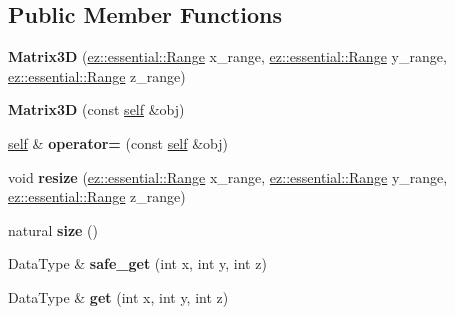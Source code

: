 \subsection*{Public Member Functions}
\begin{DoxyCompactItemize}
\item 
\mbox{\label{classez_1_1objects_1_1Matrix3D_a4c811f58573ac9d4e6734a661040610d}} 
{\bfseries Matrix3D} (\hyperlink{classez_1_1essential_1_1Range}{ez\+::essential\+::\+Range} x\+\_\+range, \hyperlink{classez_1_1essential_1_1Range}{ez\+::essential\+::\+Range} y\+\_\+range, \hyperlink{classez_1_1essential_1_1Range}{ez\+::essential\+::\+Range} z\+\_\+range)
\item 
\mbox{\label{classez_1_1objects_1_1Matrix3D_a9c59c894cd089e7df30e898825608159}} 
{\bfseries Matrix3D} (const \hyperlink{classez_1_1objects_1_1Matrix2D}{self} \&obj)
\item 
\mbox{\label{classez_1_1objects_1_1Matrix3D_a57c03371c577f882b6c3d44c10d681da}} 
\hyperlink{classez_1_1objects_1_1Matrix2D}{self} \& {\bfseries operator=} (const \hyperlink{classez_1_1objects_1_1Matrix2D}{self} \&obj)
\item 
\mbox{\label{classez_1_1objects_1_1Matrix3D_ad1ea1261c73a0d24d03e2511c01e1ec8}} 
void {\bfseries resize} (\hyperlink{classez_1_1essential_1_1Range}{ez\+::essential\+::\+Range} x\+\_\+range, \hyperlink{classez_1_1essential_1_1Range}{ez\+::essential\+::\+Range} y\+\_\+range, \hyperlink{classez_1_1essential_1_1Range}{ez\+::essential\+::\+Range} z\+\_\+range)
\item 
\mbox{\label{classez_1_1objects_1_1Matrix3D_af5488d52918f0f34f9cfffe8ed604b70}} 
natural {\bfseries size} ()
\item 
\mbox{\label{classez_1_1objects_1_1Matrix3D_abcaf2e884ff6322ea00b111eb7f1144f}} 
Data\+Type \& {\bfseries safe\+\_\+get} (int x, int y, int z)
\item 
\mbox{\label{classez_1_1objects_1_1Matrix3D_a1d88a788f1f065f9dbfc5ca80ea8c7ae}} 
Data\+Type \& {\bfseries get} (int x, int y, int z)

\end{DoxyCompactItemize}
